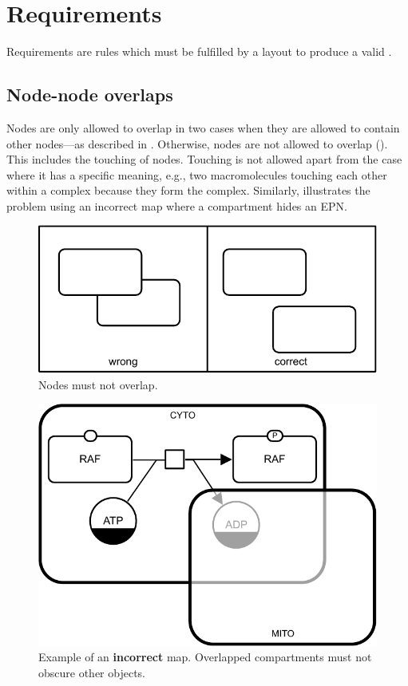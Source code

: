 \section{Requirements}

Requirements are rules which must be fulfilled by a layout to
produce a valid \PDm.

\subsection{Node-node overlaps}
\label{sec:node-node-overlap}

Nodes are only allowed to overlap in two cases when they are allowed to contain other nodes---as described in . Otherwise, nodes are not allowed to overlap (). This includes the
touching of nodes. Touching is not allowed apart from the case where
it has a specific meaning, e.g., two macromolecules touching each
other within a complex because they form the complex. Similarly,  illustrates the problem using an incorrect map where a compartment hides an EPN.

\begin{figure}[htb]
  \centering
  \includegraphics[scale=0.8]{images/build/layout_node_node.pdf}
  \caption{Nodes must not overlap.}\label{fig:layout1}
\end{figure}

\begin{figure}[H]
  \centering
  \includegraphics[scale = 0.8]{images/build/compartment_overlapping_wrong_example.pdf}
  \caption{Example of an \textbf{incorrect} map.  Overlapped compartments must not obscure other objects.}
  \label{fig:overlap-bad}
\end{figure}

